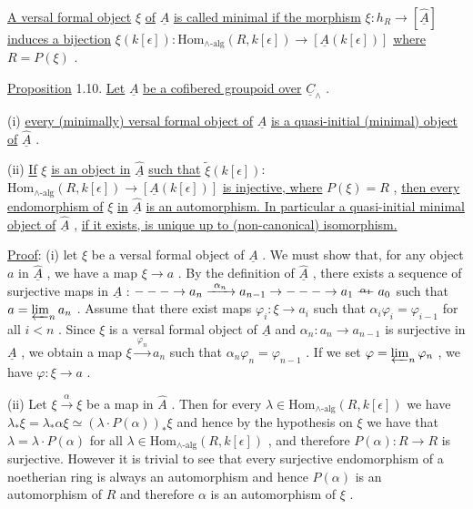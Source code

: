 \underline{A versal formal object} $\xi$ \underline{of} $\underline{A}$ \underline{is called minimal if the morphism} $\xi : h_R \to [\hat{\underline{A}}]$ \underline{induces a bijection} $\xi(k[\epsilon]) : \mathrm{Hom}_{\wedge\text{-alg}}(R,k[\epsilon]) \to [\underline{A}(k[\epsilon])]$ \underline{where} $R = P(\xi)$ .

\underline{Proposition} 1.10.  \underline{Let} $\underline{A}$ \underline{be a cofibered groupoid over} $\underline{C}_{\wedge}$ .

  (i)  \underline{every (minimally) versal formal object of} $\underline{A}$ \underline{is a quasi-initial (minimal) object of} $\hat{\underline{A}}$ .

  (ii) \underline{If} $\xi$ \underline{is an object in} $\hat{\underline{A}}$ \underline{such that} $\widetilde{\xi}(k[\epsilon])$: $\mathrm{Hom}_{\wedge\text{-alg}}(R,k[\epsilon])\to [\underline{A}(k[\epsilon])]$ \underline{is injective, where} $P(\xi) = R$ , \underline{then every endomorphism of} $\xi$ \underline{in} $\hat{\underline{A}}$ \underline{is an automorphism. In particular a quasi-initial minimal object of} $\hat{\underline{A}}$ , \underline{if it exists, is unique up to (non-canonical) isomorphism.}

\underline{Proof}: (i) let $\xi$ be a versal formal object of $\underline{A}$ . We must show that, for any object $a$ in $\hat{\underline{A}}$ , we have a map $\xi \to a$ . By the definition of $\hat{\underline{A}}$ , there exists a sequence of surjective maps in $\underline{A}$ : $--- \to a_n \xrightarrow{\ \alpha_n\ } a_{n-1} \to --- \to a_1 \overset{\alpha_1}{\relbar\joinrel\relbar} a_0$ such that $a = \varprojlim_n a_n$ . Assume that there exist maps $\varphi_i : \xi \to a_i$ such that $\alpha_i\varphi_i = \varphi_{i-1}$ for all $i < n$ . Since $\xi$ is a versal formal object of $\underline{A}$ and $\alpha_n : a_n \to a_{n-1}$ is surjective in $\underline{A}$ , we obtain a map $\xi \xrightarrow{\ \varphi_n\ } a_n$ such that $\alpha_n\varphi_n = \varphi_{n-1}$ . If we set $\varphi = \varprojlim_n \varphi_n$ , we have $\varphi : \xi \to a$ .

(ii) Let $\xi \xrightarrow{\ \alpha\ } \xi$ be a map in $\hat{A}$ . Then for every $\lambda \in \mathrm{Hom}_{\wedge\text{-alg}}(R,k[\epsilon])$ we have $\lambda_*\xi = \lambda_*\alpha\xi \simeq (\lambda\cdot P(\alpha))_*\xi$ and hence by the hypothesis on $\xi$ we have that $\lambda = \lambda\cdot P(\alpha)$ for all $\lambda \in \mathrm{Hom}_{\wedge\text{-alg}}(R,k[\epsilon])$ , and therefore $P(\alpha) : R \to R$ is surjective. However it is trivial to see that every surjective endomorphism of a noetherian ring is always an automorphism and hence $P(\alpha)$ is an automorphism of $R$ and therefore $\alpha$ is an automorphism of $\xi$ .

